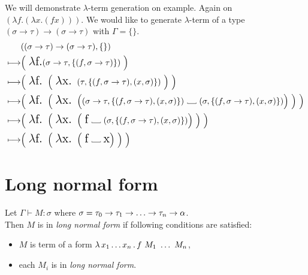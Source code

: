 \documentclass[12pt,a4paper]{report}
\newcommand{\lterm}{$\lambda$-term\xspace}
\newcommand{\turst}[3]{$#1 \vdash #2 : #3$\xspace}
\newcommand{\GMS}{\turst{\Gamma}{M}{\sigma}}
\newcommand\Vtextvisiblespace[1][.3em]{%
  \mbox{\kern.06em\vrule height.3ex}%
  \vbox{\hrule width#1}%
  \hbox{\vrule height.3ex}}
\begin{document}
We will demonstrate \lterm generation on example. 
Again on $(\lambda f . (\lambda x . (f x) ))$. 
We would like to generate \lterm of a type 
$(\sigma \rightarrow \tau) \rightarrow (\sigma \rightarrow \tau)$
with $\Gamma = \{\}$.
\begin{align*}
	& ((\sigma \rightarrow \tau) \rightarrow (\sigma \rightarrow \tau),\{\}) \\ 
	\longmapsto & \Big( \mbox{ {\Large $\lambda$f.}}
	  ( \sigma \rightarrow \tau , \{ (f,\sigma \rightarrow \tau) \} ) 
	~ \Big)
	\\
	\longmapsto & 
	\Big( \mbox{ {\Large $\lambda$f. }}
		\Big( \mbox{ {\Large $\lambda$x. }}
	  	 	( \tau , \{ (f,\sigma \rightarrow \tau) , (x,\sigma) \} ) 
		~ \Big)  	 
	~ \Big)
	\\
	\longmapsto & 
	\Big( \mbox{ {\Large $\lambda$f. }}
		\Big( \mbox{ {\Large $\lambda$x. }}	  	 	
	  	 	\Big( 
	  	 	  ( \sigma \rightarrow \tau , \{ (f,\sigma \rightarrow \tau) , (x,\sigma) \} ) 
			  \mbox{ \Vtextvisiblespace[1em] } 
			  ( \sigma , \{ (f,\sigma \rightarrow \tau) , (x,\sigma) \} )  \Big) 
		~ \Big)  	 
	 ~ \Big)
	\\
	\longmapsto & 
	\Big( \mbox{ {\Large $\lambda$f. }}
		\Big( \mbox{ {\Large $\lambda$x. }}	  	 	
	  	 	\Big( 
	  	 	  \mbox{ {\Large f}} 
			  \mbox{ \Vtextvisiblespace[1em] } 
			  ( \sigma , \{ (f,\sigma \rightarrow \tau) , (x,\sigma) \} ) \Big) 
		~ \Big)  	 
	~ \Big)		
	\\
	\longmapsto & 
	\Big( \mbox{ {\Large $\lambda$f. }}
		\Big( \mbox{ {\Large $\lambda$x. }}	  	 	
	  	 	\Big( 
	  	 	  \mbox{ {\Large f}} 
			  \mbox{ \Vtextvisiblespace[1em] } 
			  \mbox{{\Large x}} \Big) 
		~ \Big)  	 
	~ \Big)
\end{align*}


\section{Long normal form}
\label{lnf}

Let \GMS where $\sigma = \tau_0 \ar \tau_1 \ar \dots \ar \tau_n \ar \alpha$.\\
Then $M$ is in \textit{long normal form} if following 
conditions are satisfied:

\begin{itemize}
 \item $M$ is term of a form $\lambda \, x_1 \dots x_n \, . \, f~M_1~\dots~M_n$,
 \item each $M_i$ is in \textit{long normal form}.
\end{itemize}
\end{document}
